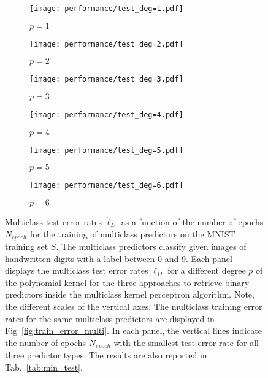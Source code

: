\begin{figure}[h!]
    \begin{subfigure}[t]{0.49\textwidth}
        \centering
        \texttt{[image: performance/test\_deg=1.pdf]} 
        \caption{$p = 1$}
    \end{subfigure}
    \hfill
    \begin{subfigure}[t]{0.49\textwidth}
        \centering
        \texttt{[image: performance/test\_deg=2.pdf]} 
        \caption{$p = 2$}
    \end{subfigure}
    \par\bigskip
        \begin{subfigure}[t]{0.49\textwidth}
        \centering
        \texttt{[image: performance/test\_deg=3.pdf]} 
        \caption{$p = 3$}
    \end{subfigure}
    \hfill
    \begin{subfigure}[t]{0.49\textwidth}
        \centering
        \texttt{[image: performance/test\_deg=4.pdf]} 
        \caption{$p = 4$}
    \end{subfigure}
    \par\bigskip
        \begin{subfigure}[t]{0.49\textwidth}
        \centering
        \texttt{[image: performance/test\_deg=5.pdf]} 
        \caption{$p = 5$}
    \end{subfigure}
    \hfill
    \begin{subfigure}[t]{0.49\textwidth}
        \centering
        \texttt{[image: performance/test\_deg=6.pdf]} 
        \caption{$p = 6$}
    \end{subfigure}
    \caption{Multiclass test error rates $\hat{\ell}_{D}$ as a function of the number of epochs $N_{epoch}$ for the training of multiclass predictors on the MNIST training set $S$. The multiclass predictors classify given images of handwritten digits with a label between $0$ and $9$. Each panel displays the multiclass test error rates $\hat{\ell}_{D}$ for a different degree $p$ of the polynomial kernel for the three approaches to retrieve binary predictors inside the multiclass kernel perceptron algorithm. Note, the different scales of the vertical axes. The multiclass training error rates for the same multiclass predictors are displayed in Fig~\ref{fig:train_error_multi}. In each panel, the vertical lines indicate the number of epochs $N_{epoch}$ with the smallest test error rate for all three predictor types. The results are also reported in Tab.~\ref{tab:min_test}.}
    \label{fig:test_error_multi}
\end{figure}

